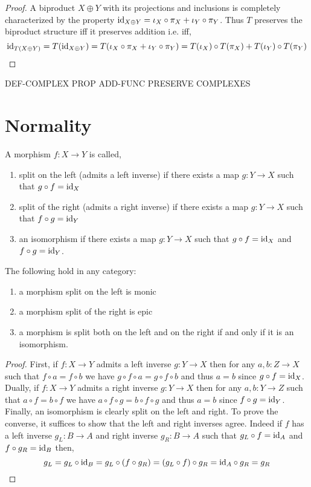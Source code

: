 \documentclass[12pt]{article}
\begin{document}
\begin{proof}
A biproduct $X \oplus Y$ with its projections and inclusions is completely characterized by the property $\mathrm{id}_{X \oplus Y} = \iota_X \circ \pi_X + \iota_Y \circ \pi_Y$. Thus $T$ preserves the biproduct structure iff it preserves addition i.e. iff,
\[ \mathrm{id}_{T(X \oplus Y)} = T(\mathrm{id}_{X \oplus Y}) = T(\iota_X \circ \pi_X + \iota_Y \circ \pi_Y) = T(\iota_X) \circ T(\pi_X) + T(\iota_Y) \circ T(\pi_Y) \]
\end{proof}

DEF-COMPLEX
PROP ADD-FUNC PRESERVE COMPLEXES

\section{Normality}

\begin{defn}
A morphism $f : X \to Y$ is called,
\begin{enumerate}
\item split on the left (admits a left inverse) if there exists a map $g : Y \to X$ such that $g \circ f = \mathrm{id}_X$
\item split of the right (admits a right inverse) if there exists a map $g : Y \to X$ such that $f \circ g = \mathrm{id}_Y$
\item an isomorphism if there exists a map $g : Y \to X$ such that $g \circ f = \mathrm{id}_X$ and $f \circ g = \mathrm{id}_Y$.
\end{enumerate}
\end{defn}

\begin{lemma}
The following hold in any category:
\begin{enumerate}
\item a morphism split on the left is monic
\item a morphism split of the right is epic
\item a morphism is split both on the left and on the right if and only if it is an isomorphism.
\end{enumerate}
\end{lemma}

\begin{proof}
First, if $f : X \to Y$ admits a left inverse $g : Y \to X$ then for any $a, b : Z \to X$ such that $f \circ a = f \circ b$ we have $g \circ f \circ a = g \circ f \circ b$ and thus $a = b$ since $g \circ f = \mathrm{id}_X$. Dually, if $f : X \to Y$ admits a right inverse $g : Y \to X$ then for any $a, b : Y \to Z$ such that $a \circ f = b \circ f$ we have $a \circ f \circ g = b \circ f \circ g$ and thus $a = b$ since $f \circ g = \mathrm{id}_Y$.
\bigskip\\
Finally, an isomorphism is clearly split on the left and right. To prove the converse, it suffices to show that the left and right inverses agree. Indeed if $f$ has a left inverse $g_L : B \to A$ and right inverse $g_R : B \to A$ such that $g_L \circ f = \mathrm{id}_A$ and $f \circ g_R = \mathrm{id}_B$ then,
\[ g_L = g_L \circ \mathrm{id}_B = g_L \circ (f \circ g_R) = (g_L \circ f) \circ g_R = \mathrm{id}_A \circ g_R = g_R \]
\end{proof}
\end{document}
